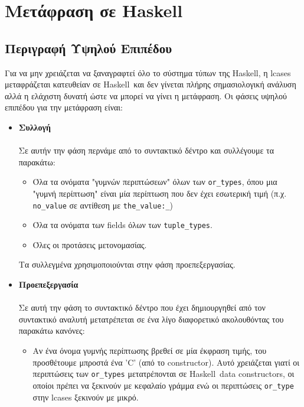 \documentclass[diploma]{softlab-thesis}
\def\H{Haskell}
\begin{document}
\chapter{Μετάφραση σε \H}

\section{Περιγραφή Υψηλού Επιπέδου}

Για να μην χρειάζεται να ξαναγραφτεί όλο το σύστημα τύπων της \H, η lcases
μεταφράζεται κατευθείαν σε \H\ και δεν γίνεται πλήρης σημασιολογική ανάλυση
αλλά η ελάχιστη δυνατή ώστε να μπορεί να γίνει η μετάφραση. Οι φάσεις υψηλού
επιπέδου για την μετάφραση είναι:

\begin{itemize}
\item
\textbf{Συλλογή}\\\\
Σε αυτήν την φάση περνάμε από το συντακτικό δέντρο και συλλέγουμε τα παρακάτω:

\begin{itemize}
\item
Όλα τα ονόματα "γυμνών περιπτώσεων" όλων των \verb|or_types|, όπου μια "γυμνή
περίπτωση" είναι μία περίπτωση που δεν έχει εσωτερική τιμή
(π.χ. \verb|no_value| σε αντίθεση με \verb|the_value:_|)

\item
Όλα τα ονόματα των fields όλων των \verb|tuple_types|.

\item
Όλες οι προτάσεις μετονομασίας.

\end{itemize}

Τα συλλεγμένα χρησιμοποιούνται στην φάση προεπεξεργασίας.

\item
\textbf{Προεπεξεργασία}\\\\
Σε αυτή την φάση το συντακτικό δέντρο που έχει δημιουργηθεί από τον συντακτικό
αναλυτή μετατρέπεται σε ένα λίγο διαφορετικό ακολουθόντας του παρακάτω κανόνες:

\begin{itemize}
\item
Αν ένα όνομα γυμνής περίπτωσης βρεθεί σε μία έκφραση τιμής, του προσθέτουμε
μπροστά ένα 'C' (από το constructor). Αυτό χρειάζεται γιατί οι περιπτώσεις των
\verb|or_types| μετατρέπονται σε \H\ data constructors, οι οποίοι πρέπει να
ξεκινούν με κεφαλαίο γράμμα ενώ οι περιπτώσεις \verb|or_type| στην lcases
ξεκινούν με μικρό.


\end{itemize}
\end{itemize}
\end{document}
